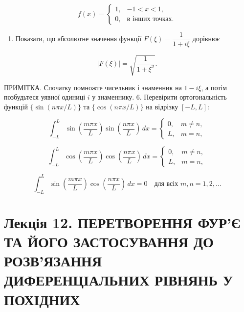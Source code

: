 \documentclass[
  ukrainian,
]{article}
\providecommand{\tightlist}{%
  \setlength{\itemsep}{0pt}\setlength{\parskip}{0pt}}
\begin{document}
\[
f(x)=
\begin{cases}
1, & -1 < x < 1,\\
0, & \text{в інших точках.}
\end{cases}
\]

\begin{enumerate}
\def\labelenumi{\arabic{enumi}.}
\setcounter{enumi}{4}
\tightlist
\item
  Показати, що абсолютне значення функції \(F(\xi)=\dfrac{1}{1+i\xi}\)
  дорівнює
\end{enumerate}

\[
\left|F(\xi)\right| = \sqrt{\frac{1}{1+\xi^2}}.
\]

ПРИМІТКА. Спочатку помножте чисельник і знаменник на \(1-i\xi\), а потім
позбудьтеся уявної одиниці \(i\) у знаменнику. 6. Перевірити
ортогональність функцій \(\{\sin(n\pi x/L)\}\) та \(\{\cos(n\pi x/L)\}\)
на відрізку \([-L,L]\):

\[
\int_{-L}^{L} \sin\!\left(\frac{m\pi x}{L}\right)\sin\!\left(\frac{n\pi x}{L}\right)\,dx =
\begin{cases}
0, & m \neq n,\\
L, & m = n,
\end{cases}
\]

\[
\int_{-L}^{L} \cos\!\left(\frac{m\pi x}{L}\right)\cos\!\left(\frac{n\pi x}{L}\right)\,dx =
\begin{cases}
0, & m \neq n,\\
L, & m = n,
\end{cases}
\]

\[
\int_{-L}^{L} \sin\!\left(\frac{m\pi x}{L}\right)\cos\!\left(\frac{n\pi x}{L}\right)\,dx = 0
\quad \text{для всіх } m,n=1,2,\dots
\]

\section{Лекція 12. ПЕРЕТВОРЕННЯ ФУР'Є ТА ЙОГО ЗАСТОСУВАННЯ ДО
РОЗВ'ЯЗАННЯ ДИФЕРЕНЦІАЛЬНИХ РІВНЯНЬ У
ПОХІДНИХ}\label{ux43bux435ux43aux446ux456ux44f-12.-ux43fux435ux440ux435ux442ux432ux43eux440ux435ux43dux43dux44f-ux444ux443ux440ux454-ux442ux430-ux439ux43eux433ux43e-ux437ux430ux441ux442ux43eux441ux443ux432ux430ux43dux43dux44f-ux434ux43e-ux440ux43eux437ux432ux44fux437ux430ux43dux43dux44f-ux434ux438ux444ux435ux440ux435ux43dux446ux456ux430ux43bux44cux43dux438ux445-ux440ux456ux432ux43dux44fux43dux44c-ux443-ux43fux43eux445ux456ux434ux43dux438ux445}
\end{document}
